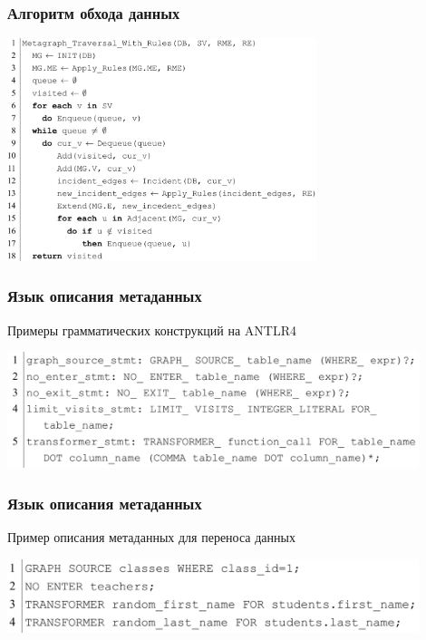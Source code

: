 \documentclass[pdf, hyperref={unicode}, aspectratio=169]{beamer}
\begin{document}
\begin{frame}
\frametitle{Алгоритм обхода данных}

	\begin{center}
		\includegraphics[height = 6.5cm]{img/algorithm-with-rules}
	\end{center}
\end{frame}


\begin{frame}
\frametitle{Язык описания метаданных}
	Примеры грамматических конструкций на ANTLR4

	\begin{center}
		\includegraphics[width = 12cm]{img/grammar}
	\end{center}
\end{frame}


\begin{frame}
\frametitle{Язык описания метаданных}
	Пример описания метаданных для переноса данных

	\begin{center}
		\includegraphics[width = 12cm]{img/language-1}
	\end{center}
\end{frame}
\end{document}
